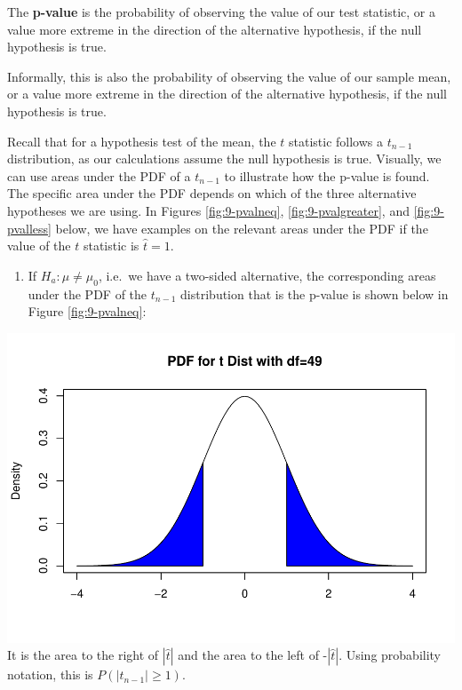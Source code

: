 \documentclass[
]{book}
\providecommand{\tightlist}{%
  \setlength{\itemsep}{0pt}\setlength{\parskip}{0pt}}
\begin{document}
The \textbf{p-value} is the probability of observing the value of our test statistic, or a value more extreme in the direction of the alternative hypothesis, if the null hypothesis is true.

Informally, this is also the probability of observing the value of our sample mean, or a value more extreme in the direction of the alternative hypothesis, if the null hypothesis is true.

Recall that for a hypothesis test of the mean, the \(t\) statistic follows a \(t_{n-1}\) distribution, as our calculations assume the null hypothesis is true. Visually, we can use areas under the PDF of a \(t_{n-1}\) to illustrate how the p-value is found. The specific area under the PDF depends on which of the three alternative hypotheses we are using. In Figures \ref{fig:9-pvalneq}, \ref{fig:9-pvalgreater}, and \ref{fig:9-pvalless} below, we have examples on the relevant areas under the PDF if the value of the \(t\) statistic is \(\hat{t} = 1\).

\begin{enumerate}
\def\labelenumi{\arabic{enumi}.}
\tightlist
\item
  If \(H_a: \mu \neq \mu_0\), i.e.~we have a two-sided alternative, the corresponding areas under the PDF of the \(t_{n-1}\) distribution that is the p-value is shown below in Figure \ref{fig:9-pvalneq}:
\end{enumerate}

\includegraphics{bookdown-demo_files/figure-latex/9-pvalneq-1.pdf}
It is the area to the right of \(|\hat{t}|\) and the area to the left of -\(|\hat{t}|\). Using probability notation, this is \(P(|t_{n-1}| \geq 1)\).
\end{document}
